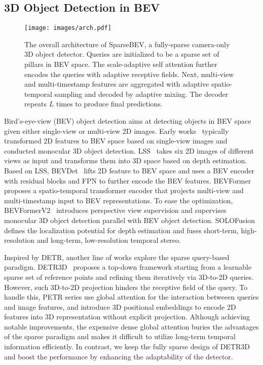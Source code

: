 \documentclass[10pt,twocolumn,letterpaper]{article}
\begin{document}
\subsection{3D Object Detection in BEV}

\begin{figure*} 
  \centering
  \texttt{[image: images/arch.pdf]}
  \vspace{-12pt}
  \caption{The overall architecture of SparseBEV, a fully-sparse camera-only 3D object detector. Queries are initialized to be a sparse set of pillars in BEV space. The scale-adaptive self attention further encodes the queries with adaptive receptive fields. Next, multi-view and multi-timestamp features are aggregated with adaptive spatio-temporal sampling and decoded by adaptive mixing. The decoder repeats $L$ times to produce final predictions.}
  \vspace{-5pt}
  \label{fig:arch}
\end{figure*}

Bird's-eye-view (BEV) object detection \cite{vpn, lss, bevdet, detr3d, petr, simmod, bevformer, bevformerv2, solofusion} aims at detecting objects in BEV space given either single-view or multi-view 2D images.
Early works~\cite{oft, pseudo-lidar, caddn} typically transformed 2D features to BEV space based on single-view images and conducted monocular 3D object detection.
LSS~\cite{lss} takes six 2D images of different views as input and transforms them into 3D space based on depth estimation.
Based on LSS, BEVDet~\cite{bevdet} lifts 2D feature to BEV space and uses a BEV encoder with residual blocks and FPN to further encode the BEV features.
BEVFormer~\cite{bevformer} proposes a spatio-temporal transformer encoder that projects multi-view and multi-timestamp input to BEV representations.
To ease the optimization, BEVFormerV2~\cite{bevformerv2} introduces perspective view supervision and supervises monocular 3D object detection parallel with BEV object detection.
SOLOFusion~\cite{solofusion} defines the localization potential for depth estimation and fuses short-term, high-resolution and long-term, low-resolution temporal stereo.

Inspired by DETR, another line of works \cite{detr3d, petr, petrv2} explore the sparse query-based paradigm.
DETR3D~\cite{detr3d} proposes a top-down framework starting from a learnable sparse set of reference points and refining them iteratively via 3D-to-2D queries.
However, such 3D-to-2D projection hinders the receptive field of the query.
To handle this, PETR series \cite{petr, petrv2} use global attention for the interaction betweeen queries and image features, and introduce 3D positional embeddings to encode 2D features into 3D representation without explicit projection.
Although achieving notable improvements, the expensive dense global attention buries the advantages of the sparse paradigm and makes it difficult to utilize long-term temporal information efficiently.
In contrast, we keep the fully sparse design of DETR3D and boost the performance by enhancing the adaptability of the detector.
\end{document}

